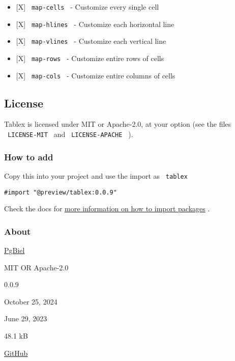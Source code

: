\begin{itemize}
\begin{itemize}
    \begin{itemize}
    \tightlist
    \item
      {[}X{]} \texttt{\ map-cells\ } - Customize every single cell
    \item
      {[}X{]} \texttt{\ map-hlines\ } - Customize each horizontal line
    \item
      {[}X{]} \texttt{\ map-vlines\ } - Customize each vertical line
    \item
      {[}X{]} \texttt{\ map-rows\ } - Customize entire rows of cells
    \item
      {[}X{]} \texttt{\ map-cols\ } - Customize entire columns of cells
    \end{itemize}
  \end{itemize}
\end{itemize}

\subsection{License}\label{license}

Tablex is licensed under MIT or Apache-2.0, at your option (see the
files \texttt{\ LICENSE-MIT\ } and \texttt{\ LICENSE-APACHE\ } ).

\subsubsection{How to add}\label{how-to-add}

Copy this into your project and use the import as \texttt{\ tablex\ }

\begin{verbatim}
#import "@preview/tablex:0.0.9"
\end{verbatim}



Check the docs for
\href{https://typst.app/docs/reference/scripting/\#packages}{more
information on how to import packages} .

\subsubsection{About}\label{about}

\begin{description}
\tightlist
\item[Author :]
\href{https://github.com/PgBiel}{PgBiel}
\item[License:]
MIT OR Apache-2.0
\item[Current version:]
0.0.9
\item[Last updated:]
October 25, 2024
\item[First released:]
June 29, 2023
\item[Archive size:]
48.1 kB
\href{https://packages.typst.org/preview/tablex-0.0.9.tar.gz}{\pandocbounded{}}
\item[Repository:]
\href{https://github.com/PgBiel/typst-tablex}{GitHub}
\end{description}

